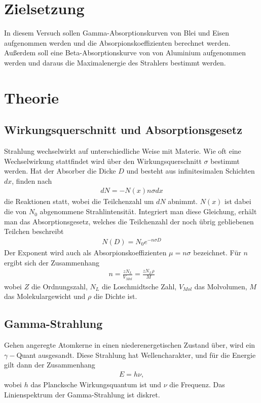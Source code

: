\section{Zielsetzung}
\label{sec:Zielsetzung}
In diesem Versuch sollen Gamma-Absorptionskurven von Blei und Eisen aufgenommen werden und die Absorpionskoeffizienten berechnet werden.
Außerdem soll eine Beta-Absorptionskurve von von Aluminium aufgenommen werden und daraus die Maximalenergie des Strahlers bestimmt werden.

\section{Theorie}
\label{sec:Theorie}
\subsection{Wirkungsquerschnitt und Absorptionsgesetz}
Strahlung wechselwirkt auf unterschiedliche Weise mit Materie. Wie oft eine Wechselwirkung stattfindet wird über den Wirkungsquerschnitt $\sigma$ bestimmt werden.
Hat der Absorber die Dicke $D$ und besteht aus infinitesimalen Schichten $dx$, finden nach 
\begin{align}
  dN = -N(x)n \sigma dx
\end{align}
die Reaktionen statt, wobei die Teilchenzahl um $dN$ abnimmt. $N(x)$ ist dabei die von $N_0$ abgenommene Strahlintensität.
Integriert man diese Gleichung, erhält man das Absorptionsgesetz, welches die Teilchenzahl der noch übrig gebliebenen Teilchen beschreibt
\begin{align}
  N(D) = N_0 e^{-n  \sigma D}
\end{align}
Der Exponent wird auch als Absorpionskoeffizienten $\mu = n \sigma$ bezeichnet.
Für $n$ ergibt sich der Zusammenhang
\begin{align}
  n = \frac{z N_L}{V_{Mol}} = \frac{z N_L \rho}{M}
\end{align}
wobei $Z$ die Ordnungszahl, $N_L$ die Loschmidtsche Zahl, $V_{Mol}$ das Molvolumen, $M$ das Molekulargewicht und $\rho$ die Dichte ist.

\subsection{Gamma-Strahlung}
Gehen angeregte Atomkerne in einen niederenergetischen Zustand über, wird ein $\gamma -$Quant ausgesandt.
Diese Strahlung hat Wellencharakter, und für die Energie gilt dann der Zusammenhang
\begin{align}
  E = h\nu ,
\end{align}
wobei $h$ das Plancksche Wirkungsquantum ist und $\nu$ die Frequenz.
Das Linienspektrum der Gamma-Strahlung ist diskret.

